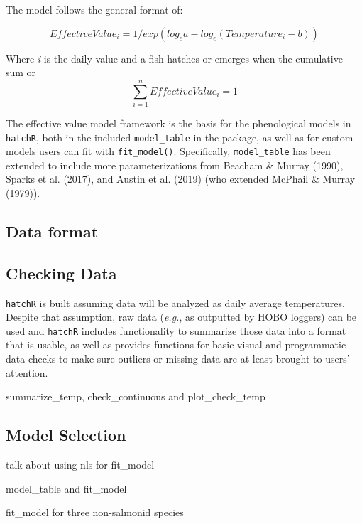\documentclass[12pt,halfline,a4paper,]{ouparticle}
\begin{document}
The model follows the general format of:

\[
Effective Value_i = 1/exp(log_ea - log_e(Temperature_i - b))
\]

Where \emph{i} is the daily value and a fish hatches or emerges when the
cumulative sum or \[\sum_{i =1}^nEffectiveValue_i = 1\]

The effective value model framework is the basis for the phenological
models in \texttt{hatchR}, both in the included \texttt{model\_table} in
the package, as well as for custom models users can fit with
\texttt{fit\_model()}. Specifically, \texttt{model\_table} has been
extended to include more parameterizations from Beacham \& Murray
(1990), Sparks et al. (2017), and Austin et al. (2019) (who extended
McPhail \& Murray (1979)).

\subsection{Data format}\label{data-format}

\subsection{Checking Data}\label{checking-data}

\texttt{hatchR} is built assuming data will be analyzed as daily average
temperatures. Despite that assumption, raw data (\emph{e.g.}, as
outputted by HOBO loggers) can be used and \texttt{hatchR} includes
functionality to summarize those data into a format that is usable, as
well as provides functions for basic visual and programmatic data checks
to make sure outliers or missing data are at least brought to users'
attention.

summarize\_temp, check\_continuous and plot\_check\_temp

\subsection{Model Selection}\label{model-selection}

talk about using nls for fit\_model

model\_table and fit\_model

fit\_model for three non-salmonid species
\end{document}
